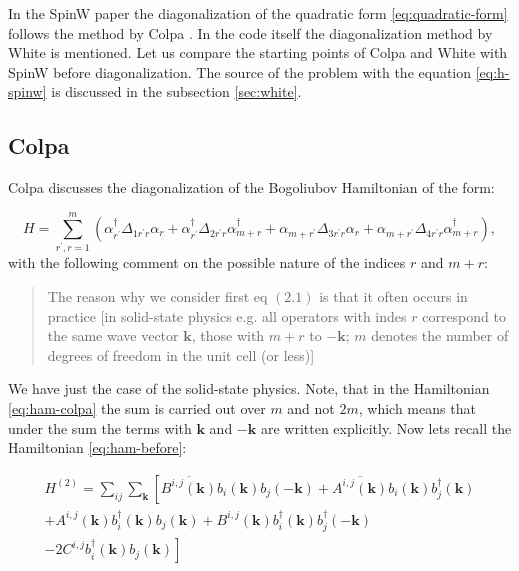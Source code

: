 \documentclass[a4paper,12pt]{article}
\begin{document}
        In the SpinW paper the diagonalization of the quadratic form \eqref{eq:quadratic-form} follows the method by Colpa \cite{colpa1978diagonalization}. 
        In the code itself the diagonalization method by White \cite{white1983quantum} is mentioned.
        Let us compare the starting points of Colpa and White with SpinW before diagonalization. 
        The source of the problem with the equation \eqref{eq:h-spinw} is discussed in the subsection \ref{sec:white}.
        
        \subsection{Colpa \cite{colpa1978diagonalization}}\label{sec:colpa}
        
            Colpa discusses the diagonalization of the Bogoliubov Hamiltonian of the form:

            \begin{equation}
                H = \sum_{r^{\prime}, r = 1}^m \left(\alpha_{r^{\prime}}^{\dag}\Delta_{1r^{\prime}r}\alpha_r +
                \alpha_{r^{\prime}}^{\dag}\Delta_{2r^{\prime}r}\alpha_{m+r}^{\dag} +
                \alpha_{m + r^{\prime}}\Delta_{3r^{\prime}r}\alpha_r +
                \alpha_{m + r^{\prime}}\Delta_{4r^{\prime}r}\alpha_{m + r}^{\dag}\right), \label{eq:ham-colpa}
            \end{equation}
            with the following comment on the possible nature of the indices $r$ and $m+r$:
            \begin{quote}
                The reason why we consider first eq $(2.1)$ is that it often occurs in practice 
                [in solid-state physics e.g. all operators with indes $r$ correspond to the same wave vector $\boldsymbol{k}$, 
                those with $m+r$ to $-\boldsymbol{k}$; $m$ denotes the number of degrees of freedom in the unit cell (or less)] 
            \end{quote}

            We have just the case of the solid-state physics. Note, that in the Hamiltonian \eqref{eq:ham-colpa} the sum is carried out over $m$ and not $2m$, 
            which means that under the sum the terms with $\boldsymbol{k}$ and $-\boldsymbol{k}$ are written explicitly. Now lets recall the Hamiltonian \eqref{eq:ham-before}:

            \begin{multline}
                H^{(2)} = \sum_{ij}\sum_{\boldsymbol{k}}\left[\overline{B^{i,j}(\boldsymbol{k})}b_{i}(\boldsymbol{k})b_{j}(-\boldsymbol{k}) +
                \overline{A^{i,j}(\boldsymbol{k})}b_{i}(\boldsymbol{k})b^{\dag}_{j}(\boldsymbol{k})\right. \\+ 
                A^{i,j}(\boldsymbol{k})b^{\dag}_{i}(\boldsymbol{k})b_{j}(\boldsymbol{k}) +
                B^{i,j}(\boldsymbol{k})b^{\dag}_{i}(\boldsymbol{k})b^{\dag}_{j}(-\boldsymbol{k}) \\-
                \left.2 C^{i,j}b^{\dag}_{i}(\boldsymbol{k})b_{j}(\boldsymbol{k})\right]
            \end{multline}
\end{document}
